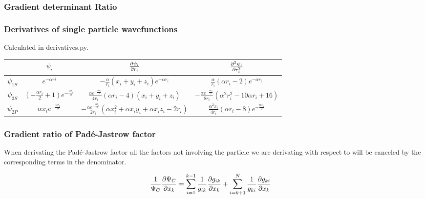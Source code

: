 \documentclass[11pt]{article}
\begin{document}
	\subsubsection{Gradient determinant Ratio}


	\subsubsection{Derivatives of single particle wavefunctions}
		Calculated in  derivatives.py.

		\begin{center}
			\begin{tabular}{| c | c | c | c |}
			\bottomrule
			& \( \psi_i\)	& \( \pdv{\psi_i}{r_i} \) & \( \pdv[2]{\psi_i}{r_i} \)
			\\ \hline
				\(\psi_{1S}\)
				&
				\( e^{- \alpha ri} \) 
				&
				\( - \frac{\alpha}{r_{i}} \left(x_{i} + y_{i} + z_{i}\right) e^{- \alpha r_{i}} \)	
				&
				\(\frac{\alpha}{r_{i}} \left(\alpha r_{i} - 2\right) e^{- \alpha r_{i}} \)
			\\	\hline
				\(\psi_{2S}\)
				&
				\( \left(- \frac{\alpha r_{i}}{2} + 1\right) e^{- \frac{\alpha r_{i}}{2}} \)&  
				\( \frac{\alpha e^{- \frac{\alpha r_{i}}{2}}}{4 r_{i}} \left(\alpha r_{i} - 4\right) \left(x_{i} + y_{i} + z_{i}\right) \)	
				&	
				\( - \frac{\alpha e^{- \frac{\alpha r_{i}}{2}}}{8 r_{i}} \left(\alpha^{2} r_{i}^{2} - 10 \alpha r_{i} + 16\right) \)
			\\	\hline
				\(\psi_{2P}\)
				&
				\( \alpha x_{i} e^{- \frac{\alpha r_{i}}{2}} \) 
				&
				\( - \frac{\alpha e^{- \frac{\alpha r_{i}}{2}}}{2 r_{i}} \left(\alpha x_{i}^{2} + \alpha x_{i} y_{i} + \alpha x_{i} z_{i} - 2 r_{i}\right) \) 
				&
				\( \frac{\alpha^{2} x_{i}}{4 r_{i}} \left(\alpha r_{i} - 8\right) e^{- \frac{\alpha r_{i}}{2}} \)
			\\ \toprule
			\end{tabular}
		\end{center}

	\subsubsection{ Gradient ratio of  Padé-Jastrow factor }

		When derivating the Padé-Jastrow factor all the factors not involving the particle we are derivating with respect to will be canceled by the corresponding terms in the denominator.

		\begin{align}
			\frac{1}{\Psi_C}\pdv{\Psi_C}{x_k} &= \sum_{i=1}^{k-1}\frac{1}{g_{ik}}\pdv{g_{ik}}{x_k} +  \sum_{i=k+1}^{N}\frac{1}{g_{ki}}\pdv{g_{ki}}{x_k}
		\end{align}
\end{document}
